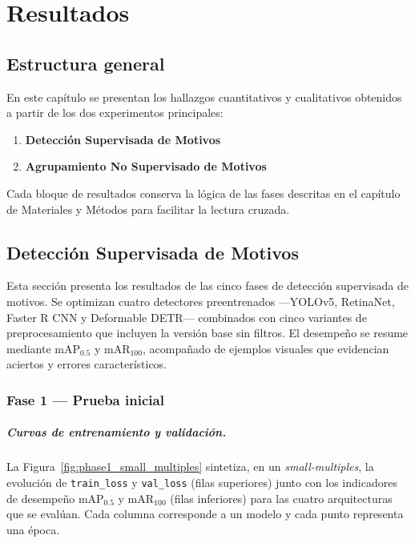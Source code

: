 \chapter{Resultados}\label{ch:resultados}

\section{Estructura general}
En este capítulo se presentan los hallazgos cuantitativos y cualitativos obtenidos a partir de los dos experimentos principales:

\begin{enumerate}
  \item \textbf{Detección Supervisada de Motivos}
  \item \textbf{Agrupamiento No Supervisado de Motivos}
\end{enumerate}

Cada bloque de resultados conserva la lógica de las fases descritas en el capítulo de Materiales y Métodos para facilitar la lectura cruzada.

\section{Detección Supervisada de Motivos}

Esta sección presenta los resultados de las cinco fases de detección supervisada de motivos.
Se optimizan cuatro detectores preentrenados —YOLOv5, RetinaNet, Faster R CNN y Deformable DETR— combinados con cinco variantes de preprocesamiento que incluyen la versión base sin filtros.
El desempeño se resume mediante mAP$_{0.5}$ y mAR$_{100}$, acompañado de ejemplos visuales que evidencian aciertos y errores característicos.

\subsection{Fase 1 — Prueba inicial}
\label{ssec:fase1}

\paragraph{Curvas de entrenamiento y validación.}
La Figura~\ref{fig:phase1_small_multiples} sintetiza, en un \emph{small-multiples}, la evolución de \texttt{train\_loss} y \texttt{val\_loss} (filas superiores) junto con los indicadores de desempeño mAP$_{0.5}$ y mAR$_{100}$ (filas inferiores) para las cuatro arquitecturas que se evalúan.
Cada columna corresponde a un modelo y cada punto representa una época.

